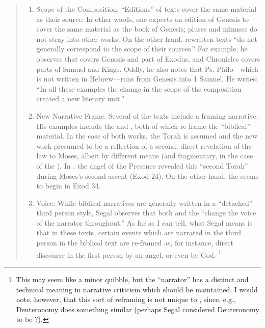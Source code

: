 \begin{quote}
\begin{enumerate}
    \item Scope of the Composition: ``Editions'' of texts cover the same material as their source. In other words, one expects an edition of Genesis to cover the same material as the book of Genesis; pluses and minuses do not stray into other works. On the other hand, rewritten texts ``do not generally correspond to the scope of their sources.''%
        \autocite[20]{segal_henze2005}
    For example, he observes that \jub covers Genesis and part of Exodus, and Chronicles covers parts of Samuel and Kings. Oddly, he also notes that Ps. Philo---which is not written in Hebrew---runs from Genesis into 1 Samuel. He writes: ``In all these examples the change in the scope of the composition created a new literary unit.''%
        \autocite[20--21]{segal_henze2005}

    \item New Narrative Frame: Several of the \rwb texts include a framing narrative. His examples include the \templescroll and \jub, both of which re-frame the ``biblical'' material. In the case of both works, the Torah is assumed and the new work presumed to be a reflection of a second, direct revelation of the law to Moses, albeit by different means (and fragmentary, in the case of the \templescroll). In \jub, the angel of the Presence revealed this ``second Torah'' during Moses's second ascent (Exod 24). On the other hand, the \templescroll seems to begin in Exod 34.%
        \autocite[22]{segal_henze2005}
   
    \item Voice: While biblical narratives are generally written in a ``detached'' third person style, Segal observes that both \jub and the \templescroll ``change the voice of the narrator throughout.''%
        \autocite[22]{segal_henze2005}
    As far as I can tell, what Segal means is that in these \rwb texts, certain events which are narrated in the third person in the biblical text are re-framed as, for instance, direct discourse in the first person by an angel, or even by God.%
        \footnote{%
            This may seem like a minor quibble, but the ``narrator'' has a distinct and technical meaning in narrative criticism which should be maintained. I would note, however, that this sort of reframing is not unique to \rwb, since, e.g., Deuteronomy does something similar (perhaps Segal considered Deuteronomy to be \rwb?).}
 

\end{enumerate}
\end{quote}
